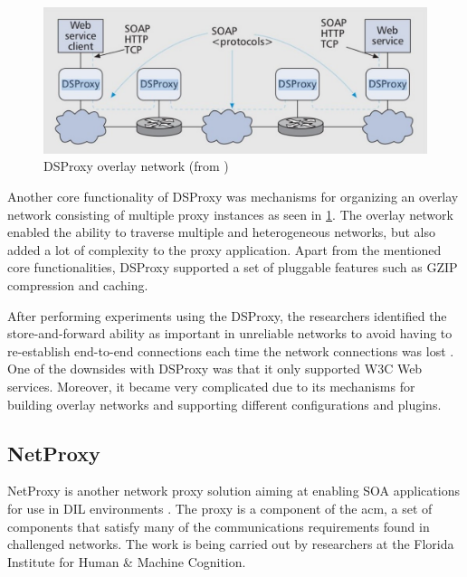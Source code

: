 \begin{figure}[h]
\includegraphics[scale=0.35]{images/dsproxy.pdf}
\caption{DSProxy overlay network (from \cite{ieee-dsproxy} )}
\label{figure:dsproxy}
\end{figure}

Another core functionality of DSProxy was mechanisms for organizing an overlay
network consisting of multiple proxy instances as seen in \cref{figure:dsproxy}.
The overlay network enabled the ability to traverse multiple and heterogeneous
networks, but also added a lot of complexity to the proxy application. Apart
from the mentioned core functionalities, DSProxy supported a set of pluggable
features such as GZIP compression and caching.

After performing experiments using the DSProxy, the researchers identified the
store-and-forward ability as important in unreliable networks to avoid having to
re-establish end-to-end connections each time the network connections was lost
\cite{dsproxy-ffi}. One of the downsides with DSProxy was that it only supported
W3C Web services. Moreover, it became very complicated due to its mechanisms for
building overlay networks and supporting different configurations and plugins.

\subsection{NetProxy}

NetProxy is another network proxy solution aiming at enabling SOA applications
for use in DIL environments \cite{suri-netproxy}. The proxy is a component of
the \gls{acm}, a set of components that satisfy many of the communications
requirements found in challenged networks. The work is being carried out by
researchers at the Florida Institute for Human \& Machine Cognition.

